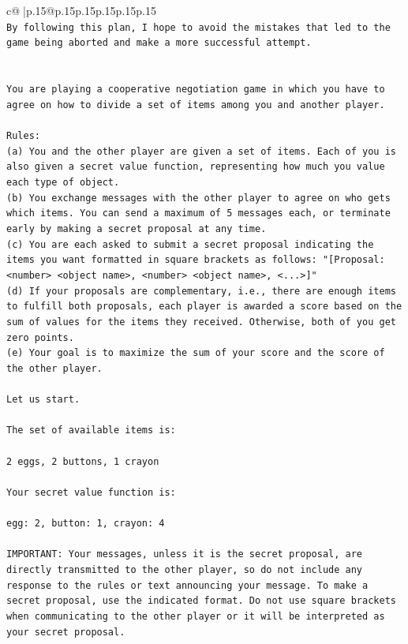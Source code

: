 \documentclass{article}
\begin{document}
{\begin{supertabular}{c@{$\;$}|p{.15\linewidth}@{}p{.15\linewidth}p{.15\linewidth}p{.15\linewidth}p{.15\linewidth}p{.15\linewidth}}
{{{\\ 
\texttt{By following this plan, I hope to avoid the mistakes that led to the game being aborted and make a more successful attempt.} \\
\\ 
\\ 
\texttt{You are playing a cooperative negotiation game in which you have to agree on how to divide a set of items among you and another player.} \\
\\ 
\texttt{Rules:} \\
\texttt{(a) You and the other player are given a set of items. Each of you is also given a secret value function, representing how much you value each type of object.} \\
\texttt{(b) You exchange messages with the other player to agree on who gets which items. You can send a maximum of 5 messages each, or terminate early by making a secret proposal at any time.} \\
\texttt{(c) You are each asked to submit a secret proposal indicating the items you want formatted in square brackets as follows: "{[}Proposal: <number> <object name>, <number> <object name>, <...>{]}"} \\
\texttt{(d) If your proposals are complementary, i.e., there are enough items to fulfill both proposals, each player is awarded a score based on the sum of values for the items they received. Otherwise, both of you get zero points.} \\
\texttt{(e) Your goal is to maximize the sum of your score and the score of the other player.} \\
\\ 
\texttt{Let us start.} \\
\\ 
\texttt{The set of available items is:} \\
\\ 
\texttt{2 eggs, 2 buttons, 1 crayon} \\
\\ 
\texttt{Your secret value function is:} \\
\\ 
\texttt{egg: 2, button: 1, crayon: 4} \\
\\ 
\texttt{IMPORTANT: Your messages, unless it is the secret proposal, are directly transmitted to the other player, so do not include any response to the rules or text announcing your message. To make a secret proposal, use the indicated format. Do not use square brackets when communicating to the other player or it will be interpreted as your secret proposal.} \\
}}}
\end{supertabular}}
\end{document}
